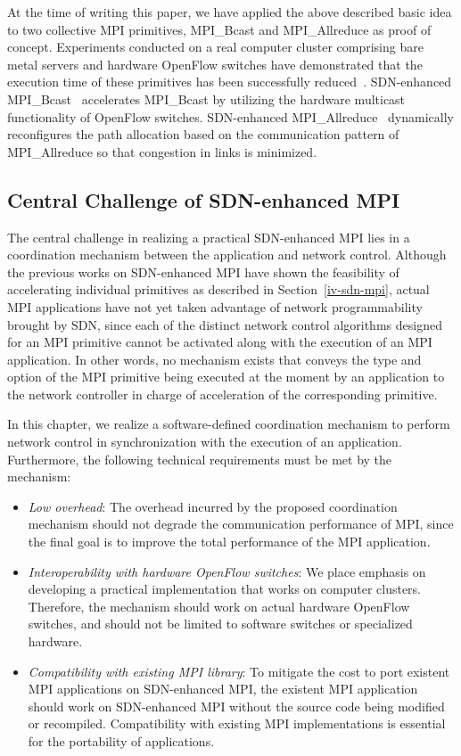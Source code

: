 At the time of writing this paper, we have applied the above described
basic idea to two collective MPI primitives, MPI\_Bcast and
MPI\_Allreduce as proof of concept. Experiments conducted on a real
computer cluster comprising bare metal servers and hardware OpenFlow
switches have demonstrated that the execution time of these primitives
has been successfully reduced~\autocites{Dashdavaa2014}{Takahashi2014}.
SDN-enhanced MPI\_Bcast~\autocite{Dashdavaa2014} accelerates MPI\_Bcast
by utilizing the hardware multicast functionality of OpenFlow switches.
SDN-enhanced MPI\_Allreduce~\autocite{Takahashi2014} dynamically
reconfigures the path allocation based on the communication pattern of
MPI\_Allreduce so that congestion in links is minimized.

\subsection{Central Challenge of SDN-enhanced MPI}

The central challenge in realizing a practical SDN-enhanced MPI lies in
a coordination mechanism between the application and network control.
Although the previous works on SDN-enhanced MPI have shown the
feasibility of accelerating individual primitives as described in
Section~\ref{iv-sdn-mpi}, actual MPI applications have not yet
taken advantage of network programmability brought by SDN, since each of
the distinct network control algorithms designed for an MPI primitive
cannot be activated along with the execution of an MPI application. In
other words, no mechanism exists that conveys the type and option of the
MPI primitive being executed at the moment by an application to the
network controller in charge of acceleration of the corresponding
primitive.

In this chapter, we realize a software-defined coordination mechanism to
perform network control in synchronization with the execution of an
application. Furthermore, the following technical requirements must be
met by the mechanism:

\begin{itemize}
\item
  \emph{Low overhead}: The overhead incurred by the proposed coordination
  mechanism should not degrade the communication performance of MPI, since the
  final goal is to improve the total performance of the MPI application.
\item
  \emph{Interoperability with hardware OpenFlow switches}: We place emphasis
  on developing a practical implementation that works on computer clusters.
  Therefore, the mechanism should work on actual hardware OpenFlow switches,
  and should not be limited to software switches or specialized hardware.
\item
  \emph{Compatibility with existing MPI library}: To mitigate the
  cost to port existent MPI applications on SDN-enhanced MPI, the existent MPI
  application should work on SDN-enhanced MPI without the source code being
  modified or recompiled. Compatibility with existing MPI implementations is
  essential for the portability of applications.
\end{itemize}

